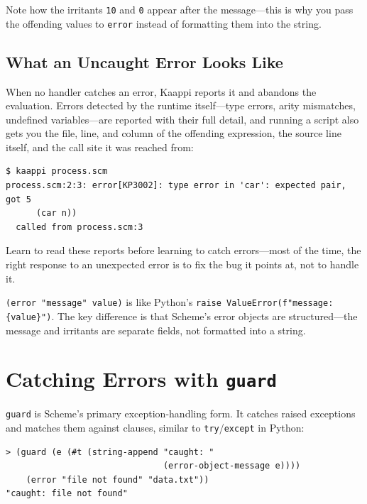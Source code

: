 Note how the irritants \texttt{10} and \texttt{0} appear after the message---this is why you pass the offending values to \texttt{error} instead of formatting them into the string.

\subsection{What an Uncaught Error Looks Like}

When no handler catches an error, Kaappi reports it and abandons the evaluation. Errors detected by the runtime itself---type errors, arity mismatches, undefined variables---are reported with their full detail, and running a script also gets you the file, line, and column of the offending expression, the source line itself, and the call site it was reached from:

\begin{Verbatim}[fontsize=\footnotesize]
$ kaappi process.scm
process.scm:2:3: error[KP3002]: type error in 'car': expected pair, got 5
      (car n))
  called from process.scm:3
\end{Verbatim}

Learn to read these reports before learning to catch errors---most of the time, the right response to an unexpected error is to fix the bug it points at, not to handle it.

\begin{note}
\texttt{(error "message" value)} is like Python's \texttt{raise ValueError(f"message: \{value\}")}. The key difference is that Scheme's error objects are structured---the message and irritants are separate fields, not formatted into a string.
\end{note}

\section{Catching Errors with \texttt{guard}}

\texttt{guard} is Scheme's primary exception-handling form. It catches raised exceptions and matches them against clauses, similar to \texttt{try}/\texttt{except} in Python:

\begin{lstlisting}[style=repl]
> (guard (e (#t (string-append "caught: "
                               (error-object-message e))))
    (error "file not found" "data.txt"))
"caught: file not found"
\end{lstlisting}

